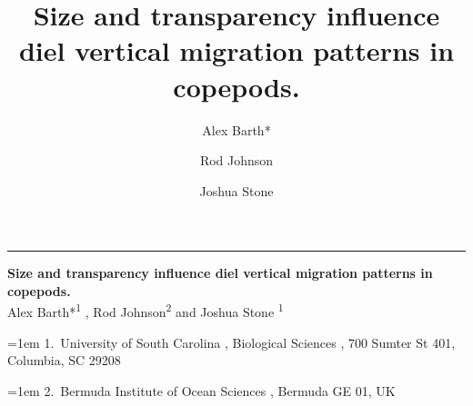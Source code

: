 \documentclass[
]{article}
\title{Size and transparency influence diel vertical migration patterns
in copepods.}
\author{Alex Barth* \and Rod Johnson \and Joshua Stone}
\date{}
\begin{document}
    \begin{titlepage}

\raggedleft %
\rule{1pt}{\textheight} %
\hspace{0.05\textwidth} %
\begin{minipage}[b][\textheight][s]{0.85\textwidth}

\raggedright
{\large\bfseries\nohyphens{Size and transparency influence diel vertical
migration patterns in copepods.}}\\[2\baselineskip] 

  
 {\large{Alex Barth*}}{\textsuperscript{1}}%
%
, 
 {\large{Rod Johnson}}{\textsuperscript{2}}%
%
%
{ and \large{Joshua Stone}}%
{\textsuperscript{1}}%
%



  
\vspace{2\baselineskip} 

\hangindent=1em
%
{1}.~{University of South Carolina}%
%
, %
{Biological Sciences}%
%
%
, %
{700 Sumter St 401, Columbia, SC 29208}%
%
\par\hangindent=1em%
%
{2}.~{Bermuda Institute of Ocean Sciences}%
%
%
, %
{Bermuda GE 01, UK}%
%

  
\vspace{1\baselineskip} 

              

\vfill


  
\vspace{0.1\textheight} 

\end{minipage}  \end{titlepage}
  \ifdefined\Shaded\renewenvironment{Shaded}{\begin{tcolorbox}[boxrule=0pt, interior hidden, sharp corners, borderline west={3pt}{0pt}{shadecolor}, enhanced, frame hidden, breakable]}{\end{tcolorbox}}\fi
\end{document}
